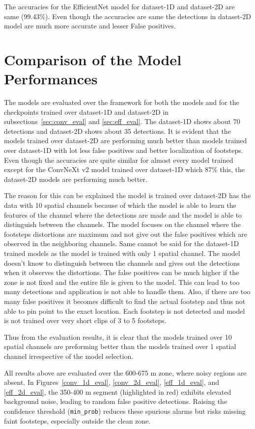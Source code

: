 The accuracies for the EfficientNet model for dataset-1D and dataset-2D are same (99.43\%). Even though the accuracies are same the detections in dataset-2D model are much more accurate and lesser False positives. 

\section{Comparison of the Model Performances}
The models are evaluated over the framework for both the models and for the checkpoints trained over dataset-1D and dataset-2D in subsections~\ref{sec:conv_eval} and \ref{sec:eff_eval}. The dataset-1D shows about 70 detections and dataset-2D shows about 35 detections. It is evident that the models trained over dataset-2D are performing much better than models trained over dataset-1D with lot less false positives and better localization of footsteps. Even though the accuracies are quite similar for almost every model trained except for the ConvNeXt v2 model trained over dataset-1D which 87\% this, the dataset-2D models are performing much better. 

The reason for this can be explained the model is trained over dataset-2D has the data with 10 spatial channels because of which the model is able to learn the features of the channel where the detections are made and the model is able to distinguish between the channels. The model focuses on the channel where the footsteps distortions are maximum and not give out the false positives which are observed in the neighboring channels. Same cannot be said for the dataset-1D trained models as the model is trained with only 1 spatial channel. The model doesn't know to distinguish between the channels and gives out the detections when it observes the distortions. The false positives can be much higher if the zone is not fixed and the entire file is given to the model. This can lead to too many detections and application is not able to handle them. Also, if there are too many false positives it becomes difficult to find the actual footstep and thus not able to pin point to the exact location. Each footstep is not detected and model is not trained over very short clips of 3 to 5 footsteps.

Thus from the evaluation results, it is clear that the models trained over 10 spatial channels are preforming better than the models trained over 1 spatial channel irrespective of the model selection.

All results above are evaluated over the 600-675 m zone, where noisy regions are absent. In Figures~\ref{conv_1d_eval}, \ref{conv_2d_eval}, \ref{eff_1d_eval}, and \ref{eff_2d_eval}, the 350-400 m segment (highlighted in red) exhibits elevated background noise, leading to random false positive detections. Raising the confidence threshold (\texttt{min\_prob}) reduces these spurious alarms but risks missing faint footsteps, especially outside the clean zone.

